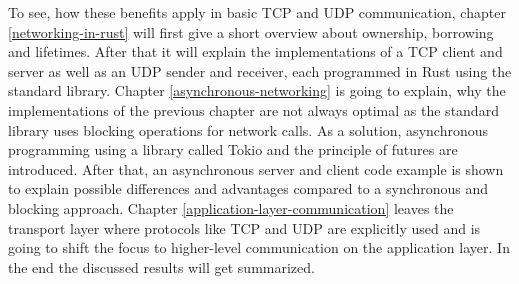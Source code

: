 To see, how these benefits apply in basic TCP and UDP communication, chapter \ref{networking-in-rust} will first give a
short overview about ownership, borrowing and lifetimes. After that it will explain the implementations of a TCP client
and server as well as an UDP sender and receiver, each programmed in Rust using the standard library. Chapter
\ref{asynchronous-networking} is going to explain, why the implementations of the previous chapter are not always
optimal as the standard library uses blocking operations for network calls. As a solution, asynchronous programming
using a library called Tokio and the principle of futures are introduced. After that, an asynchronous server and client
code example is shown to explain possible differences and advantages compared to a synchronous and blocking approach.
Chapter \ref{application-layer-communication} leaves the transport layer where protocols like TCP and UDP are
explicitly used and is going to shift the focus to higher-level communication on the application layer. In the end
the discussed results will get summarized.
